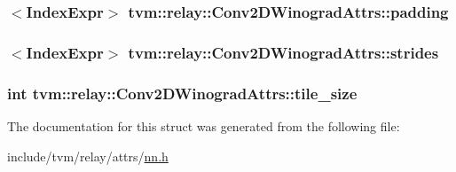 \subsubsection[{\texorpdfstring{padding}{padding}}]{$<${\bf Index\+Expr}$>$ tvm\+::relay\+::\+Conv2\+D\+Winograd\+Attrs\+::padding}\hypertarget{structtvm_1_1relay_1_1Conv2DWinogradAttrs_af2caa695b5aabb9f92d48aa76f6c8314}{}\label{structtvm_1_1relay_1_1Conv2DWinogradAttrs_af2caa695b5aabb9f92d48aa76f6c8314}
\subsubsection[{\texorpdfstring{strides}{strides}}]{$<${\bf Index\+Expr}$>$ tvm\+::relay\+::\+Conv2\+D\+Winograd\+Attrs\+::strides}\hypertarget{structtvm_1_1relay_1_1Conv2DWinogradAttrs_a1458affba446b79cec2416102fc3951c}{}\label{structtvm_1_1relay_1_1Conv2DWinogradAttrs_a1458affba446b79cec2416102fc3951c}
\subsubsection[{\texorpdfstring{tile\+\_\+size}{tile_size}}]{\setlength{\rightskip}{0pt plus 5cm}int tvm\+::relay\+::\+Conv2\+D\+Winograd\+Attrs\+::tile\+\_\+size}\hypertarget{structtvm_1_1relay_1_1Conv2DWinogradAttrs_a3d89aa2ad84ad78f147b5bf068f89f62}{}\label{structtvm_1_1relay_1_1Conv2DWinogradAttrs_a3d89aa2ad84ad78f147b5bf068f89f62}


The documentation for this struct was generated from the following file\+:\begin{DoxyCompactItemize}
\item 
include/tvm/relay/attrs/\hyperlink{include_2tvm_2relay_2attrs_2nn_8h}{nn.\+h}\end{DoxyCompactItemize}
